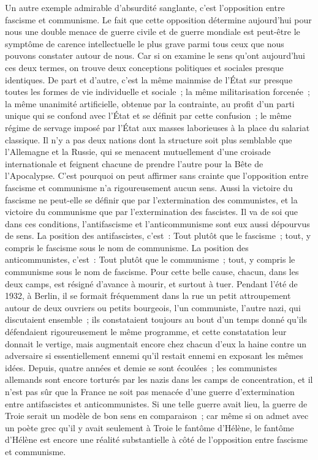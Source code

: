 \documentclass[french,twoside]{book} %
\begin{document}
Un autre exemple admirable d'absurdité sanglante, c'est l'opposition entre fascisme et communisme. Le fait que cette opposition détermine aujourd'hui pour nous une double menace de guerre civile et de guerre mondiale est peut-être le symptôme de carence intellectuelle le plus grave parmi tous ceux que nous pouvons constater autour de nous. Car si on examine le sens qu'ont aujourd'hui ces deux termes, on trouve deux conceptions politiques et sociales presque identiques. De part et d'autre, c'est la même mainmise de l'État sur presque toutes les formes de vie individuelle et sociale ; la même militari­sation forcenée ; la même unanimité artificielle, obtenue par la contrainte, au profit d'un parti unique qui se confond avec l'État et se définit par cette confusion ; le même régime de servage imposé par l'État aux masses labo­rieuses à la place du salariat classique. Il n'y a pas deux nations dont la structure soit plus semblable que l'Allemagne et la Russie, qui se menacent mutuellement d'une croisade internationale et feignent chacune de prendre l'autre pour la Bête de l'Apocalypse. C'est pourquoi on peut affirmer sans crainte que l'opposition entre fascisme et communisme n'a rigoureusement aucun sens. Aussi la victoire du fascisme ne peut-elle se définir que par l'extermination des communistes, et la victoire du communisme que par l'extermination des fascistes. Il va de soi que dans ces conditions, l'anti­fascisme et l'anticommunisme sont eux aussi dépourvus de sens. La position des antifascistes, c'est : Tout plutôt que le fascisme ; tout, y compris le fascisme sous le nom de communisme. La position des anticommunistes, c'est : Tout plutôt que le communisme ; tout, y compris le communisme sous le nom de fascisme. Pour cette belle cause, chacun, dans les deux camps, est résigné d'avance à mourir, et surtout à tuer. Pendant l'été de 1932, à Berlin, il se formait fréquemment dans la rue un petit attroupement autour de deux ouvriers ou petits bourgeois, l'un communiste, l'autre nazi, qui discutaient ensemble ; ils constataient toujours au bout d'un temps donné qu'ils défen­daient rigoureusement le même programme, et cette constatation leur donnait le vertige, mais augmentait encore chez chacun d'eux la haine contre un adversaire si essentiellement ennemi qu'il restait ennemi en exposant les mêmes idées. Depuis, quatre années et demie se sont écoulées ; les commu­nistes allemands sont encore torturés par les nazis dans les camps de concentration, et il n'est pas sûr que la France ne soit pas menacée d'une guerre d'extermination entre antifascistes et anticommunistes. Si une telle guerre avait lieu, la guerre de Troie serait un modèle de bon sens en compa­raison ; car même si on admet avec un poète grec qu'il y avait seulement à Troie le fantôme d'Hélène, le fantôme d'Hélène est encore une réalité substantielle à côté de l'opposition entre fascisme et communisme.\par
\end{document}
